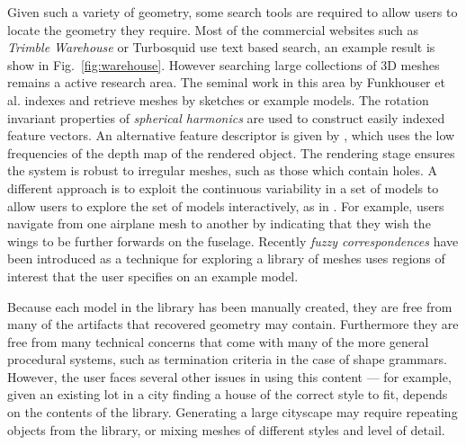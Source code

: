 Given such a variety of geometry, some search tools are required to allow users to locate the geometry they require. Most of the commercial websites such as \emph{Trimble Warehouse}\cite{GoogleWarehouse} or Turbosquid use text based search, an example result is show in Fig.~\ref{fig:warehouse}. However searching large collections of 3D meshes remains a active research area. The seminal work in this area by Funkhouser et al.\cite{Funkhouser03} indexes and retrieve meshes by sketches or example models. The rotation invariant properties of \emph{spherical harmonics} are used to construct easily indexed feature vectors. An alternative feature descriptor is given by \cite{Ohbuchi03b}, which uses the low frequencies of the depth map of the rendered object. The rendering stage ensures the system is robust to irregular meshes, such as those which contain holes. 
A different approach is to exploit the continuous variability in a set of models to allow users to explore the set of models interactively, as in \cite{Ovsjanikov11}. For example, users navigate from one airplane mesh to another by indicating that they wish the wings to be further forwards on the fuselage. Recently \emph{fuzzy correspondences} have been introduced as a technique for exploring a library of meshes uses regions of interest that the user specifies on an example model.

Because each model in the library has been manually created, they are free from many of the artifacts that recovered geometry may contain. Furthermore they are free from many technical concerns that come with many of the more general procedural systems, such as termination criteria in the case of shape grammars. However, the user faces several other issues in using this content --- for example, given an existing lot in a city finding a house of the correct style to fit, depends on the contents of the library. Generating a large cityscape may require repeating objects from the library, or mixing meshes of different styles and level of detail. 




